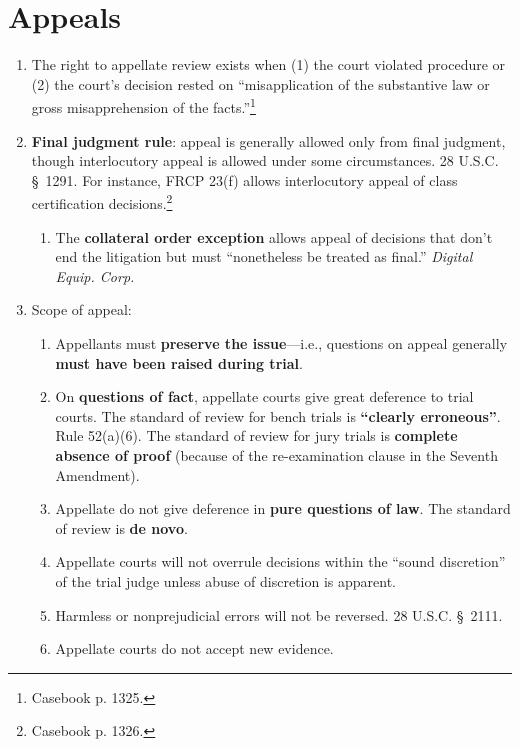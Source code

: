 \section{Appeals}

\begin{enumerate}
    \item The right to appellate review exists when (1) the court
    violated procedure or (2) the court's decision rested on ``misapplication 
    of the substantive law or gross misapprehension of the 
    facts.''\footnote{Casebook p. 1325.}
    \item \textbf{Final judgment rule}: appeal is generally allowed only from 
    final judgment, though interlocutory appeal is allowed under some 
    circumstances. 28 U.S.C. \S\ 1291. For instance, FRCP 23(f) allows 
    interlocutory appeal of class certification decisions.\footnote{Casebook 
    p. 1326.}
    \begin{enumerate}
        \item The \textbf{collateral order exception} allows appeal of 
        decisions that don't end the litigation but must ``nonetheless be 
        treated as final.'' 
    \emph{Digital Equip. Corp.}
    \end{enumerate}
    \item Scope of appeal:
    \begin{enumerate}
        \item Appellants must \textbf{preserve the issue}---i.e., questions on 
        appeal generally \textbf{must have been raised during trial}.
        \item On \textbf{questions of fact}, appellate courts give great 
        deference to trial courts. The standard of review for bench trials is 
        \textbf{``clearly erroneous''}. Rule 52(a)(6). The standard of review 
        for jury trials is \textbf{complete absence of proof} (because of the 
        re-examination clause in the Seventh Amendment).
        \item Appellate do not give deference in \textbf{pure questions 
        of law}. The standard of review is \textbf{de novo}.
        \item Appellate courts will not overrule decisions within the ``sound 
        discretion'' of the trial judge unless abuse of discretion is 
        apparent.
        \item Harmless or nonprejudicial errors will not be reversed. 28 
        U.S.C. \S\ 2111.
        \item Appellate courts do not accept new evidence.

\end{enumerate}
\end{enumerate}
